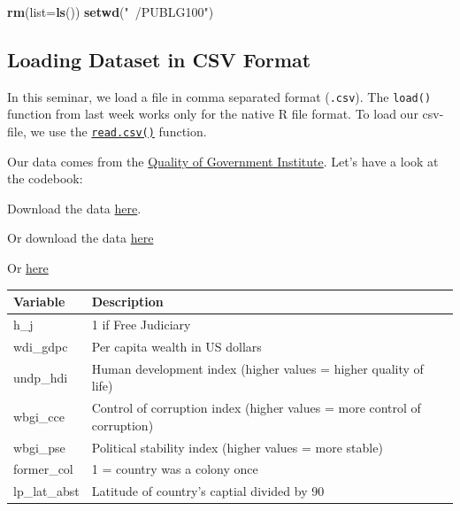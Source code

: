 \documentclass[]{book}
\newenvironment{Shaded}{\begin{snugshade}}{\end{snugshade}}
\newcommand{\KeywordTok}[1]{\textcolor[rgb]{0.13,0.29,0.53}{\textbf{#1}}}
\newcommand{\DataTypeTok}[1]{\textcolor[rgb]{0.13,0.29,0.53}{#1}}
\newcommand{\StringTok}[1]{\textcolor[rgb]{0.31,0.60,0.02}{#1}}
\newcommand{\NormalTok}[1]{#1}
\theoremstyle{definition}
\theoremstyle{definition}
\theoremstyle{definition}
\theoremstyle{remark}
\begin{document}
\begin{Shaded}
\begin{Highlighting}[]
\KeywordTok{rm}\NormalTok{(}\DataTypeTok{list=}\KeywordTok{ls}\NormalTok{())}
\KeywordTok{setwd}\NormalTok{(}\StringTok{"~/PUBLG100"}\NormalTok{)}
\end{Highlighting}
\end{Shaded}

\subsection{Loading Dataset in CSV
Format}\label{loading-dataset-in-csv-format}

In this seminar, we load a file in comma separated format
(\texttt{.csv}). The \texttt{load()} function from last week works only
for the native R file format. To load our csv-file, we use the
\href{https://stat.ethz.ch/R-manual/R-devel/library/utils/html/read.table.html}{\texttt{read.csv()}}
function.

Our data comes from the \href{http://qog.pol.gu.se/}{Quality of
Government Institute}. Let's have a look at the codebook:

Download the data
\href{https://github.com/philippbroniecki/statistics1/raw/master/data/QoG2012.csv}{here}.

Or download the data
\href{https://github.com/downloads/philippbroniecki/statistics1/data/QoG2012.csv}{here}

Or
\href{https://raw.github.com/philippbroniecki/statistics1/branch/master/data/QoG2012.csv}{here}

\begin{tabular}{l|l}
\hline
Variable & Description\\
\hline
h\_j & 1 if Free Judiciary\\
\hline
wdi\_gdpc & Per capita wealth in US dollars\\
\hline
undp\_hdi & Human development index (higher values = higher quality of life)\\
\hline
wbgi\_cce & Control of corruption index (higher values = more control of corruption)\\
\hline
wbgi\_pse & Political stability index (higher values = more stable)\\
\hline
former\_col & 1 = country was a colony once\\
\hline
lp\_lat\_abst & Latitude of country's captial divided by 90\\
\hline
\end{tabular}
\end{document}
